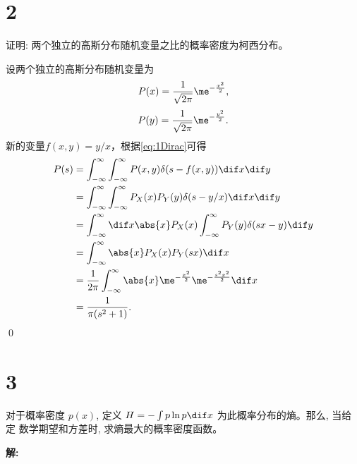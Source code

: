 \documentclass[12pt,a4]{ctexart}
\begin{document}
\section{2}

证明: 两个独立的高斯分布随机变量之比的概率密度为柯西分布。

设两个独立的高斯分布随机变量为
\begin{equation}
	P(x) = \frac{1}{\sqrt{2\pi}} \me^{-\frac{x^2}{2}},
\end{equation}
\begin{equation}
	P(y) = \frac{1}{\sqrt{2\pi}} \me^{-\frac{y^2}{2}}.
\end{equation}
新的变量$f(x,y) = y / x$，根据\cref{eq:1Dirac}可得
\begin{equation}
	\begin{aligned}
		P(s) & =\int_{-\infty}^{\infty} \int_{-\infty}^{\infty} P(x, y) \delta(s-f(x, y)) \dif x \dif y              \\
			 & =\int_{-\infty}^{\infty} \int_{-\infty}^{\infty} P_X(x) P_Y(y) \delta(s-y/x) \dif x \dif y            \\
			 & =\int_{-\infty}^{\infty} \dif x \abs{x} P_X(x)  \int_{-\infty}^{\infty}   P_Y(y) \delta(sx-y)  \dif y \\
			 & =\int_{-\infty}^{\infty} \abs{x} P_X(x) P_Y(sx) \dif x                                                \\
			 & = \frac{1}{2\pi} \int_{-\infty}^{\infty} \abs{x} \me^{-\frac{x^2}{2}} \me^{-\frac{s^2x^2}{2}} \dif x  \\
			 & = \frac{1}{\pi (s^2+1)}.
	\end{aligned}
\end{equation}\qed



\section{3}

对于概率密度 $p(x)$, 定义 $H=-\int p \ln p \dif x$ 为此概率分布的熵。那么, 当给定 数学期望和方差时, 求熵最大的概率密度函数。

\textsf{\hspace{-2em}\sf  \textbf{解:}}
\end{document}
